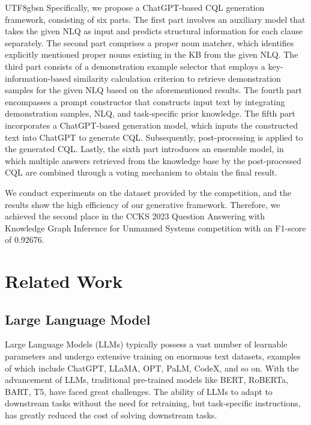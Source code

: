 \documentclass[runningheads]{llncs}
\begin{document}
\begin{CJK*}{UTF8}{gbsn}
Specifically, we propose a ChatGPT-based CQL generation framework, consisting of six parts. 
The first part involves an auxiliary model that takes the given NLQ as input and predicts structural information for each clause separately. 
The second part comprises a proper noun matcher, which identifies explicitly mentioned proper nouns existing in the KB from the given NLQ. 
The third part consists of a demonstration example selector that employs a key-information-based similarity calculation criterion to retrieve demonstration samples for the given NLQ based on the aforementioned results.
The fourth part encompasses a prompt constructor that constructs input text by integrating demonstration samples, NLQ, and task-specific prior knowledge. 
The fifth part incorporates a ChatGPT-based generation model, which inputs the constructed text into ChatGPT to generate CQL. Subsequently, post-processing is applied to the generated CQL. 
Lastly, the sixth part introduces an ensemble model, in which multiple answers retrieved from the knowledge base by the post-processed CQL are combined through a voting mechanism to obtain the final result.

We conduct experiments on the dataset provided by the competition, and the results show the high efficiency of our generative framework. 
Therefore, we achieved the second place in the CCKS 2023 Question Answering with Knowledge Graph Inference for Unmanned Systems competition with an F1-score of 0.92676.

\section{Related Work}

\subsection{Large Language Model}
\label{LLM}
Large Language Models (LLMs) typically possess a vast number of learnable parameters and undergo extensive training on enormous text datasets, examples of which include ChatGPT\cite{openai-chatgpt}, LLaMA\cite{touvron2023llama}, OPT\cite{zhang2022opt}, PaLM\cite{chowdhery2022palm}, CodeX\cite{chen2021evaluating}, 
and so on. 
With the advancement of LLMs, traditional pre-trained models like BERT\cite{devlin2018bert}, RoBERTa\cite{liu2019roberta}, BART\cite{lewis2019bart}, 
T5\cite{raffel2020exploring}, have faced great challenges. 
The ability of LLMs to adapt to downstream tasks without the need for retraining, but task-specific instructions, has greatly reduced the cost of solving downstream tasks.


\end{CJK*}
\end{document}
